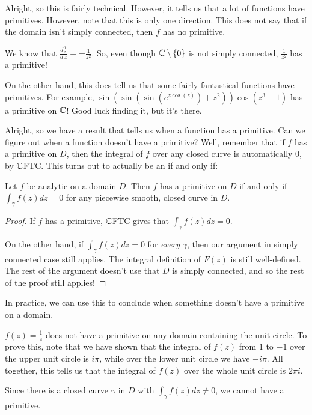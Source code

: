 Alright, so this is fairly technical. However, it tells us that a lot of functions have primitives. However, note that this is only one direction. This does not say that if the domain isn't simply connected, then $f$ has no primitive.

\begin{ex}{}{} We know that $\frac{d\frac{1}{z}}{d\,z} = -\frac{1}{z^2}$. So, even though $\mathbb{C}\setminus\{0\}$ is not simply connected, $\frac{1}{z^2}$ has a primitive!

On the other hand, this does tell us that some fairly fantastical functions have primitives. For example, $\sin(\sin(\sin(e^{z\cos(z)})+z^2))\cos(z^3 - 1)$ has a primitive on $\mathbb{C}$! Good luck finding it, but it's there.
\end{ex}

Alright, so we have a result that tells us when a function has a primitive. Can we figure out when a function doesn't have a primitive? Well, remember that if $f$ has a primitive on $D$, then the integral of $f$ over any closed curve is automatically $0$, by $\mathbb{C}$FTC. This turns out to actually be an if and only if:

\begin{thmbo}{}{} Let $f$ be analytic on a domain $D$. Then $f$ has a primitive on $D$ if and only if $\int_\gamma f(z)dz = 0$ for any piecewise smooth, closed curve in $D$.\end{thmbo}

\begin{proof} If $f$ has a primitive, $\mathbb{C}$FTC gives that $\int_{\gamma}f(z)dz = 0$.

On the other hand, if $\int_{\gamma}f(z)dz =0$ for {\it every} $\gamma$, then our argument in simply connected case still applies. The integral definition of $F(z)$ is still well-defined. The rest of the argument doesn't use that $D$ is simply connected, and so the rest of the proof still applies!\end{proof}

In practice, we can use this to conclude when something doesn't have a primitive on a domain.

\begin{ex}{}{} $f(z) = \frac{1}{z}$ does not have a primitive on any domain containing the unit circle. To prove this, note that we have shown that the integral of $f(z)$ from $1$ to $-1$ over the upper unit circle is $i\pi$, while over the lower unit circle we have $-i\pi$. All together, this tells us that the integral of $f(z)$ over the whole unit circle is $2\pi i$.

Since there is a closed curve $\gamma$ in $D$ with $\int_{\gamma}f(z)dz \ne 0$, we cannot have a primitive.
\end{ex}

